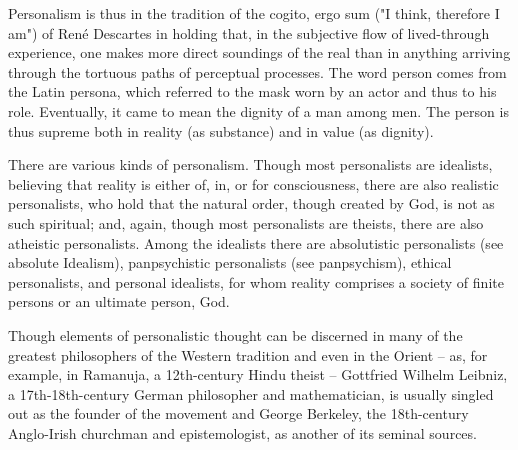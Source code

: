 \documentclass[12pt]{article}
\begin{document}
                                      Personalism is thus in the tradition of the cogito, ergo sum ("I
                                      think, therefore I am") of Ren\'{e} Descartes in holding that, in the
                                      subjective flow of lived-through experience, one makes more direct
                                      soundings of the real than in anything arriving through the tortuous
                                      paths of perceptual processes. The word person comes from the Latin
                                      persona, which referred to the mask worn by an actor and thus to his
                                      role. Eventually, it came to mean the dignity of a man among men. The
                                      person is thus supreme both in reality (as substance) and in value (as
                                      dignity). 


                                      There are various kinds of personalism. Though most personalists
                                      are idealists, believing that reality is either of, in, or for
                                      consciousness, there are also realistic personalists, who hold that
                                      the natural order, though created by God, is not as such spiritual; and,
                                      again, though most personalists are theists, there are also atheistic
                                      personalists. Among the idealists there are absolutistic personalists
                                      (see absolute Idealism), panpsychistic personalists (see
                                      panpsychism), ethical personalists, and personal idealists, for whom
                                      reality comprises a society of finite persons or an ultimate person,
                                      God. 


                                      Though elements of personalistic thought can be discerned in many of
                                      the greatest philosophers of the Western tradition and even in the
                                      Orient -- as, for example, in Ramanuja, a 12th-century Hindu theist --
                                      Gottfried Wilhelm Leibniz, a 17th-18th-century German philosopher
                                      and mathematician, is usually singled out as the founder of the
                                      movement and George Berkeley, the 18th-century Anglo-Irish
                                      churchman and epistemologist, as another of its seminal sources. 
\end{document}
